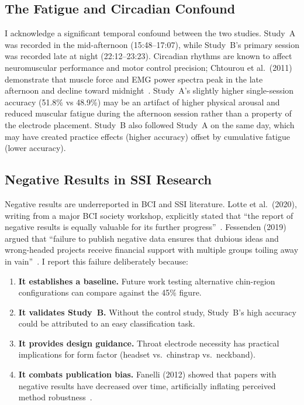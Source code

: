 \documentclass[11pt, a4paper]{article}
\begin{document}
\subsection{The Fatigue and Circadian Confound}

I acknowledge a significant temporal confound between the two studies. Study~A was recorded in the mid-afternoon (15:48--17:07), while Study~B's primary session was recorded late at night (22:12--23:23). Circadian rhythms are known to affect neuromuscular performance and motor control precision; Chtourou et al.\ (2011) demonstrate that muscle force and EMG power spectra peak in the late afternoon and decline toward midnight~\cite{chtourou2011}. Study~A's slightly higher single-session accuracy (51.8\% vs 48.9\%) may be an artifact of higher physical arousal and reduced muscular fatigue during the afternoon session rather than a property of the electrode placement. Study~B also followed Study~A on the same day, which may have created practice effects (higher accuracy) offset by cumulative fatigue (lower accuracy).

\subsection{Negative Results in SSI Research}

Negative results are underreported in BCI and SSI literature. Lotte et al.\ (2020), writing from a major BCI society workshop, explicitly stated that ``the report of negative results is equally valuable for its further progress''~\cite{lotte2020}. Fessenden (2019) argued that ``failure to publish negative data ensures that dubious ideas and wrong-headed projects receive financial support with multiple groups toiling away in vain''~\cite{fessenden2019}. I report this failure deliberately because:
\begin{enumerate}
    \item \textbf{It establishes a baseline.} Future work testing alternative chin-region configurations can compare against the 45\% figure.
    \item \textbf{It validates Study~B.} Without the control study, Study~B's high accuracy could be attributed to an easy classification task.
    \item \textbf{It provides design guidance.} Throat electrode necessity has practical implications for form factor (headset vs.\ chinstrap vs.\ neckband).
    \item \textbf{It combats publication bias.} Fanelli (2012) showed that papers with negative results have decreased over time, artificially inflating perceived method robustness~\cite{fanelli2012}.
\end{enumerate}
\end{document}
